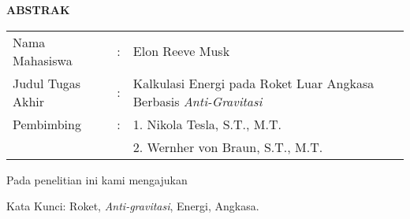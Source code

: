 \begin{center}
  \large\textbf{ABSTRAK}
\end{center}

\vspace{2ex}

\begingroup
  \setlength{\tabcolsep}{0pt}

  \noindent
  \begin{tabularx}{\textwidth}{l >{\centering}m{2em} X}
    Nama Mahasiswa    &:& Elon Reeve Musk \\

    Judul Tugas Akhir &:&	Kalkulasi Energi pada Roket Luar Angkasa Berbasis \emph{Anti-Gravitasi} \\

    Pembimbing        &:& 1. Nikola Tesla, S.T., M.T. \\
                      & & 2. Wernher von Braun, S.T., M.T. \\
  \end{tabularx}
\endgroup

Pada penelitian ini kami mengajukan \lipsum[1]

Kata Kunci: Roket, \emph{Anti-gravitasi}, Energi, Angkasa.

